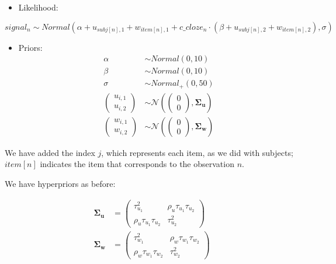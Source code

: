 \documentclass[12pt,]{krantz}
\providecommand{\tightlist}{%
  \setlength{\itemsep}{0pt}\setlength{\parskip}{0pt}}
\theoremstyle{definition}
\theoremstyle{definition}
\theoremstyle{definition}
\theoremstyle{remark}
\begin{document}
\begin{itemize}
\tightlist
\item
  Likelihood:
\end{itemize}

\begin{equation}
  signal_n \sim Normal(\alpha + u_{subj[n],1} + w_{item[n],1} + c\_cloze_n \cdot  (\beta + u_{subj[n],2}+ w_{item[n],2}), \sigma)
  \end{equation}

\begin{itemize}
\tightlist
\item
  Priors:
  \begin{equation}
   \begin{aligned}
   \alpha & \sim Normal(0,10) \\
   \beta  & \sim Normal(0,10) \\
    \sigma  &\sim Normal_+(0,50)\\
    {\begin{pmatrix}
    u_{i,1} \\
    u_{i,2}
    \end{pmatrix}}
   &\sim {\mathcal {N}}
    \left(
   {\begin{pmatrix} 
    0\\
    0
   \end{pmatrix}}
   ,\boldsymbol{\Sigma_u} \right) \\
     {\begin{pmatrix}
    w_{i,1} \\
    w_{i,2}
    \end{pmatrix}}
   &\sim {\mathcal {N}}
    \left(
   {\begin{pmatrix} 
    0\\
    0
   \end{pmatrix}}
   ,\boldsymbol{\Sigma_w} \right) 
   \end{aligned}
   \end{equation}
\end{itemize}

We have added the index \(j\), which represents each item, as we did with subjects; \(item[n]\) indicates the item that corresponds to the observation \(n\).

We have hyperpriors as before:

\begin{equation}
\begin{aligned}
 \boldsymbol{\Sigma_u} & = 
{\begin{pmatrix} 
\tau_{u_1}^2 & \rho_u \tau_{u_1} \tau_{u_2} \\ 
\rho_u \tau_{u_1} \tau_{u_2} & \tau_{u_2}^2
\end{pmatrix}}\\
 \boldsymbol{\Sigma_w} & = 
{\begin{pmatrix} 
\tau_{w_1}^2 & \rho_w \tau_{w_1} \tau_{w_2} \\ 
\rho_w \tau_{w_1} \tau_{w_2} & \tau_{w_2}^2
\end{pmatrix}}
 \end{aligned}
\end{equation}
\end{document}
